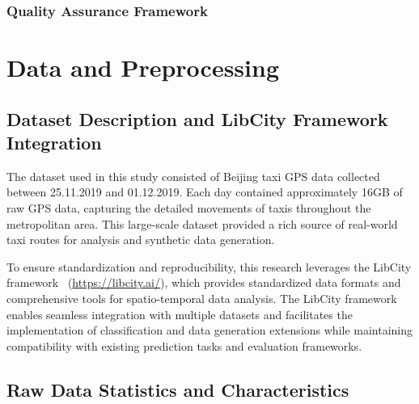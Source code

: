 \documentclass[runningheads]{llncs}
\begin{document}
\begin{compactoutline}
\end{compactoutline}

\subsubsection{Quality Assurance Framework}
\label{sec:quality-assurance}

\begin{compactoutline}
\end{compactoutline}

\section{Data and Preprocessing}
\label{sec:data-preprocessing}

\subsection{Dataset Description and LibCity Framework Integration}
\label{sec:data}

The dataset used in this study consisted of Beijing taxi GPS data collected between 25.11.2019 and 01.12.2019. Each day contained approximately 16GB of raw GPS data, capturing the detailed movements of taxis throughout the metropolitan area. This large-scale dataset provided a rich source of real-world taxi routes for analysis and synthetic data generation.

To ensure standardization and reproducibility, this research leverages the LibCity framework~\cite{libcitylong} (\url{https://libcity.ai/}), which provides standardized data formats and comprehensive tools for spatio-temporal data analysis. The LibCity framework enables seamless integration with multiple datasets and facilitates the implementation of classification and data generation extensions while maintaining compatibility with existing prediction tasks and evaluation frameworks.

\subsection{Raw Data Statistics and Characteristics}
\label{sec:raw-data}
\end{document}
